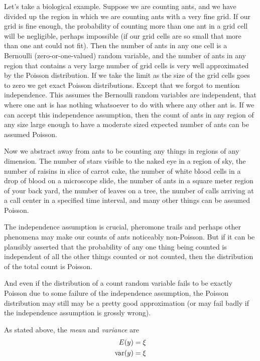 Let's take a biological example.  Suppose we are counting ants, and we
have divided up the region in which we are counting ants with a very fine
grid.  If our grid is fine enough, the probability of counting more than one
ant in a grid cell will be negligible, perhaps impossible (if our grid cells
are so small that more than one ant could not fit).  Then the number of
ants in any one cell is a Bernoulli (zero-or-one-valued) random variable,
and the number of ants in any region that contains a very large number
of grid cells is very well approximated by the Poisson distribution.
If we take the limit as the size of the grid cells goes to zero we
get exact Poisson distributions.  Except that we forgot to mention
independence.  This assumes the Bernoulli random variables are independent,
that where one ant is has nothing whatsoever to do with where any other ant
is.  If we can accept this independence assumption, then the count of
ants in any region of any size large enough to have a moderate sized
expected number of ants can be assumed Poisson.

Now we abstract away from ants to be counting any things in regions of
any dimension.  The number of stars visible to the naked eye in a region
of sky, the number of raisins in slice of carrot cake, the number of white
blood cells in a drop of blood on a microscope slide, the number of ants
in a square meter region of your back yard, the number of leaves on a tree,
the number of calls arriving at a call center in a specified time interval,
and many other things can be assumed Poisson.

The independence assumption is crucial, pheromone trails and perhaps other
phenomena may make our counts of ants noticeably non-Poisson.  But if it
can be plausibly asserted that the probability of any one thing being counted
is independent of all the other things counted or not counted, then the
distribution of the total count is Poisson.

And even if the distribution of a count random variable fails to be exactly
Poisson due to some failure of the independence assumption, the Poisson
distribution may still may be a pretty good approximation (or may fail badly
if the independence assumption is grossly wrong).

As stated above, the \emph{mean} and \emph{variance} are
\begin{align*}
   E(y) & = \xi
   \\
   \operatorname{var}(y) & = \xi
\end{align*}

